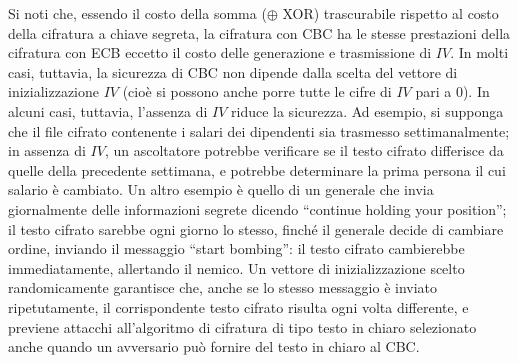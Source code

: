 Si noti che, essendo il costo della somma ($\oplus$ XOR) trascurabile rispetto al costo della cifratura a chiave segreta, la cifratura con CBC ha le stesse prestazioni della cifratura con ECB eccetto il costo delle generazione e trasmissione di $IV$. In molti casi, tuttavia, la sicurezza di CBC non dipende dalla
scelta del vettore di inizializzazione $IV$ (cioè si possono anche porre tutte le cifre di $IV$ pari a 0).\newline \newline
In alcuni casi, tuttavia, l'assenza di $IV$ riduce la sicurezza. Ad esempio, si supponga che il file cifrato contenente i salari dei dipendenti sia trasmesso settimanalmente; in assenza di $IV$, un ascoltatore potrebbe verificare se il testo cifrato differisce da quelle della precedente settimana, e potrebbe determinare la prima persona il cui salario è cambiato. Un altro esempio è quello di un generale che invia
giornalmente delle informazioni segrete dicendo “continue holding your position”; il testo cifrato sarebbe ogni giorno lo stesso, finché il generale decide di cambiare ordine, inviando il messaggio “start bombing”: il testo cifrato cambierebbe immediatamente, allertando il nemico.\newline
Un vettore di inizializzazione scelto randomicamente garantisce che, anche se lo stesso messaggio è inviato ripetutamente, il corrispondente testo cifrato risulta ogni volta differente, e previene attacchi all'algoritmo di cifratura di tipo testo in chiaro selezionato anche quando un avversario può fornire del testo in chiaro al CBC.
